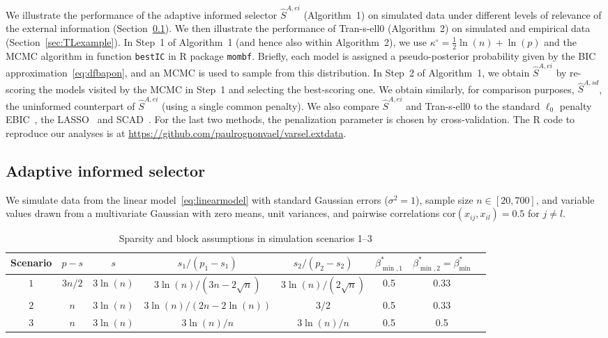 \documentclass[
  12pt]{article}
\begin{document}
We illustrate the performance of the adaptive informed selector $\hat{S}^{A,ei}$ (Algorithm~1) on simulated data under different levels of relevance of the external information (Section~\ref{sec:simulationsss}).
We then illustrate the performance of Tran-s-ell0 (Algorithm~2) on simulated and empirical data (Section~\ref{sec:TLexample}).
In Step~1 of Algorithm~1 (and hence also within Algorithm~2), we use $\kappa^{\circ}=\tfrac12\ln(n)+\ln(p)$ and
the MCMC algorithm in function \texttt{bestIC} in R package \texttt{mombf}. Briefly, each model is assigned a
pseudo-posterior probability given by the BIC approximation~\eqref{eq:dfbapon}, and an MCMC is used to sample from this distribution. 
In Step~2 of Algorithm~1, we obtain $\hat S^{A,ei}$ by re-scoring the models visited by the MCMC in Step~1 and selecting the best-scoring one. We obtain similarly, for comparison purposes, $\hat S^{A,sd}$, the uninformed counterpart of $\hat{S}^{A,ei}$ (using a single common penalty). We also compare $\hat S^{A,ei}$ and Tran-s-ell0 to the standard $\ell_0$ penalty EBIC~\citep{EBIC}, the LASSO~\citep{lasso} and SCAD~\citep{Fan01SCAD}. For the last two methods, the penalization parameter is chosen by cross-validation. The R code to reproduce our analyses is at \url{https://github.com/paulrognonvael/varsel.extdata}.


\subsection{Adaptive informed selector}\label{sec:simulationsss}

We simulate data from the linear model~\eqref{eq:linearmodel} with standard Gaussian errors ($\sigma^2=1$), sample size $n \in [20,700]$, and variable values drawn from a multivariate Gaussian with zero means, unit variances, and pairwise correlations $\mbox{cor}(x_{ij}, x_{il})= 0.5$ for $j \neq l$.

\begin{table}[ht]
\caption{Sparsity and block assumptions in simulation scenarios 1--3}
\label{tab:examples_bis}
\begin{center}
\begin{tabular}[]{@{}cccccccc@{}}
\hline
Scenario & $p-s$ & $s$ & $s_1/(p_1-s_1)$ &$s_2/(p_2-s_2)$ & $\beta_{\min,1}^*$ & $\beta_{\min,2}^*=\beta_{\min}^*$ \\
\hline
$1$    & $3n/2$ & $3\ln(n)$ & $3\ln(n)/(3n-2\sqrt{n})$ & $3\ln(n)/(2\sqrt{n})$  & 0.5 & 0.33\\
$2$    & $n$ & $3\ln(n)$ & $3\ln(n)/(2n-2\ln(n))$ & $3/2$   & 0.5 & 0.33 \\
$3$    & $n$ & $3\ln(n)$ & $3\ln(n)/n$ & $3\ln(n)/n$  & 0.5 & 0.5\\
\hline
\end{tabular}
\end{center}
\end{table}
\end{document}
